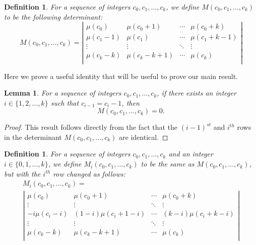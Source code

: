\documentclass[12pt]{amsart}
\newtheorem{definition}[theorem]{Definition}
\newtheorem{lemma}[theorem]{Lemma}
\newcommand{\ifact}{\mu}
\newcommand{\M}{M}
\begin{document}
\begin{definition}
For a sequence of integers $c_0, c_1, \dots, c_k$, we define $\M(c_0, c_1, \dots, c_k)$ to be the following determinant:
$$
\M(c_0, c_1, \dots, c_k) = \left|
\begin{matrix}
\ifact(c_0) & \ifact(c_0+1) & \cdots & \ifact(c_0+k) \\
\ifact(c_1-1) & \ifact(c_1) & \cdots & \ifact(c_1+k-1) \\
\vdots & \vdots & \ddots & \vdots \\
\ifact(c_k-k) & \ifact(c_k-k+1) & \cdots & \ifact(c_k) \\
\end{matrix} \right|
$$
\end{definition}

Here we prove a useful identity that will be useful to prove our main result.

\begin{lemma}
For a sequence of integers $c_0, c_1, \dots, c_k$, if there exists an integer $i \in \{1, 2, \dots, k\}$ such that $c_{i - 1} = c_{i} - 1$, then
$$
\M(c_0, c_1, \dots, c_k) = 0.
$$
\label{lem:mcornercase}
\end{lemma}

\begin{proof}
This result follows directly from the fact that the $(i-1)^{st}$ and $i^{th}$ rows in the determinant $\M(c_0, c_1, \dots, c_k)$ are identical.
\end{proof}

\begin{definition}
For a sequence of integers $c_0, c_1, \dots, c_k$ and an integer $i \in \{0,1,\dots,k\}$, we define $\M_i(c_0,c_1,\dots,c_k)$ to be the same as $\M(c_0, c_1, \dots, c_k)$, but with the $i^{th}$ row changed as follows:
\begin{multline*}
\M_i(c_0, c_1, \dots, c_k) = \\
\left|
\begin{matrix}
\ifact(c_0) & \ifact(c_0+1) & \cdots & \ifact(c_0+k) \\
\vdots & \vdots & \ddots & \vdots \\
-i\ifact(c_i-i) & (1-i)\ifact(c_i + 1 - i) & \cdots & (k-i) \ifact(c_i+k-i) \\
\vdots & \vdots & \ddots & \vdots \\
\ifact(c_k-k) & \ifact(c_k-k+1) & \cdots & \ifact(c_k) \\
\end{matrix} \right|
\end{multline*}
\end{definition}
\end{document}
